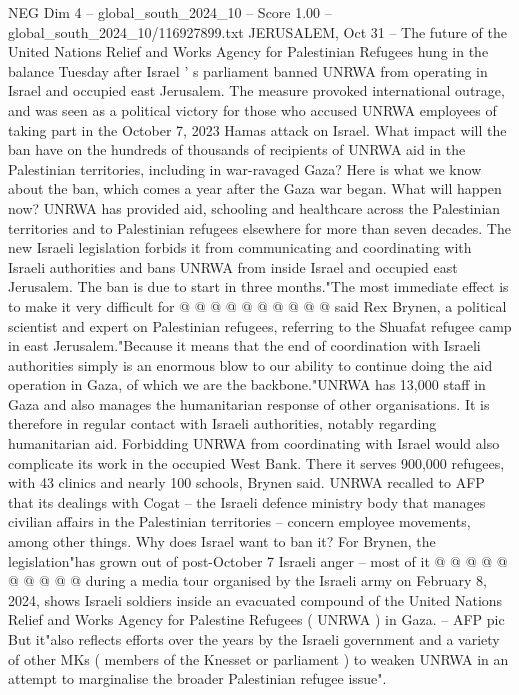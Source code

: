 \begin{textsample}{NEG Dim 4 – global\_south\_2024\_10 – Score 1.00 – global\_south\_2024\_10/116927899.txt}  \label{ex:f4_neg_067}
JERUSALEM, Oct 31 -- The future of the United Nations Relief and Works Agency for Palestinian Refugees hung in the balance Tuesday after Israel ' s parliament banned UNRWA from operating in Israel and occupied east Jerusalem.
The measure provoked international outrage, and was seen as a political victory for those who accused UNRWA employees of taking part in the October 7, 2023 Hamas attack on Israel.
What impact will the ban have on the hundreds of thousands of recipients of UNRWA aid in the Palestinian territories, including in war-ravaged Gaza?
Here is what we know about the ban, which comes a year after the Gaza war began.
What will happen now?
UNRWA has provided aid, schooling and healthcare across the Palestinian territories and to Palestinian refugees elsewhere for more than seven decades.
The new Israeli legislation forbids it from communicating and coordinating with Israeli authorities and bans UNRWA from inside Israel and occupied east Jerusalem.
The ban is due to start in three months."The most immediate effect is to make it very difficult for @ @ @ @ @ @ @ @ @ @ said Rex Brynen, a political scientist and expert on Palestinian refugees, referring to the Shuafat refugee camp in east Jerusalem."Because it means that the end of coordination with Israeli authorities simply is an enormous blow to our ability to continue doing the aid operation in Gaza, of which we are the backbone."UNRWA has 13,000 staff in Gaza and also manages the humanitarian response of other organisations.
It is therefore in regular contact with Israeli authorities, notably regarding humanitarian aid.
Forbidding UNRWA from coordinating with Israel would also complicate its work in the occupied West Bank.
There it serves 900,000 refugees, with 43 clinics and nearly 100 schools, Brynen said.
UNRWA recalled to AFP that its dealings with Cogat -- the Israeli defence ministry body that manages civilian affairs in the Palestinian territories -- concern employee movements, among other things.
Why does Israel want to ban it?
For Brynen, the legislation"has grown out of post-October 7 Israeli anger -- most of it @ @ @ @ @ @ @ @ @ @ during a media tour organised by the Israeli army on February 8, 2024, shows Israeli soldiers inside an evacuated compound of the United Nations Relief and Works Agency for Palestine Refugees ( UNRWA ) in Gaza. -- AFP pic But it"also reflects efforts over the years by the Israeli government and a variety of other MKs ( members of the Knesset or parliament ) to weaken UNRWA in an attempt to marginalise the broader Palestinian refugee issue".

\end{textsample}
